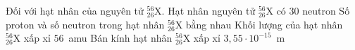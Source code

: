 	\begin{ex}%
		Đối với hạt nhân của nguyên tử ${}^{56}_{26}\text{X}$.
		\choiceTFt
		{\True Hạt nhân nguyên tử ${}^{56}_{26}\text{X}$ có $30$ neutron}
		{Số proton và số neutron trong hạt nhân ${}^{56}_{26}\text{X}$ bằng nhau}
		{\True Khối lượng của hạt nhân ${}^{56}_{26}\text{X}$ xấp xỉ $56$~amu}
		{Bán kính hạt nhân ${}^{56}_{26}\text{X}$ xấp xỉ $3{,}55\cdot 10^{-15}$~m}
	\end{ex}

